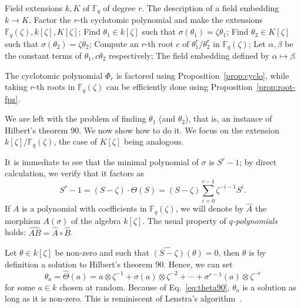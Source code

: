 \documentclass[12pt]{article}
\theoremstyle{plain}
\theoremstyle{definition}
\def\F{\ensuremath{\mathbb{F}}}
\newcounter{algorithm}
\begin{document}
\begin{algorithm}
	\begin{algorithmic}[1]
		\REQUIRE Field extensions $k, K$ of $\F_q$ of degree $r$.
		\ENSURE The description of a field embedding $k\to K$.
		\STATE Factor the $r$-th cyclotomic polynomial and make the extensions $\F_q(\zeta), 
		k[\zeta], K[\zeta]$;
		\STATE Find $\theta_1 \in k[\zeta]$ such that $\sigma(\theta_1) = \zeta\theta_1$;
		\STATE Find $\theta_2 \in K[\zeta]$ such that $\sigma(\theta_2) = \zeta\theta_2$;
		\STATE Compute an $r$-th root $c$ of $\theta_1^r / \theta_2^r$ in $\F_q(\zeta)$;
		\STATE Let $\alpha, \beta$ be the constant terms of $\theta_1, c\theta_2$ respectively;
		\RETURN The field embedding defined by $\alpha\mapsto\beta$.
	\end{algorithmic}
        \label{alog:allombert}
\end{algorithm}

The cyclotomic polynomial $\Phi_r$ is factored using Proposition~\ref{prop:cyclo}, while
taking $r$-th roots in $\F_q(\zeta)$ can be efficiently done using 
Proposition~\ref{prop:root-fpz}.

We are left with the problem of finding $\theta_1$ (and $\theta_2$), that is, an instance of Hilbert's theorem 90.
We now show how to do it.
We focus on the extension $k[\zeta]/\F_q(\zeta)$, the case of
$K[\zeta]$ being analogous.

It is immediate to see that the minimal polynomial of $\sigma$ is
$S^r-1$; by direct calculation, we verify that it factors as
\begin{equation}
  \label{eq:theta90}
  S^r-1 = (S-\zeta)\cdot\Theta(S) =
  (S-\zeta)\sum_{i=0}^{r-1} \zeta^{-i-1}S^i. 
\end{equation}
If $A$ is a polynomial with coefficients in $\F_q(\zeta)$, we will
denote by $\hat{A}$ the morphism $A(\sigma)$ of the algebra
$k[\zeta]$. %
The usual property of \emph{$q$-polynomials} holds:
$\widehat{AB} = \hat{A}\circ\hat{B}$.

Let $\theta\in k[\zeta]$ be non-zero and such that $\widehat{(S-\zeta)}(\theta)=0$,
then $\theta$ is by definition a solution to Hilbert's
theorem 90. %
Hence, we can set
\begin{equation}
  \label{eq:thetaa}
  \theta_a = \hat\Theta(a)
  =  a\otimes\zeta^{-1} + \sigma(a)\otimes\zeta^{-2} + \cdots + \sigma^{r-1}(a)\otimes\zeta^{-r}
\end{equation}
for some $a\in k$ chosen at random. %
Because of Eq.~\eqref{eq:theta90}, $\theta_a$ is a solution as long as
it is non-zero. %
This is reminiscent of Lenstra's algorithm~\cite[Th.~5.2]{LenstraJr91}.
\end{document}
